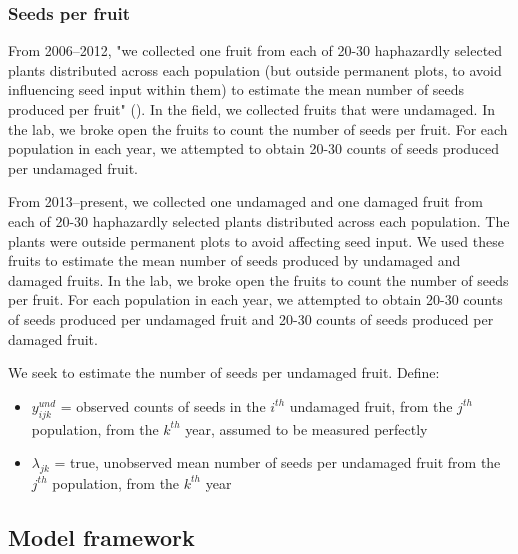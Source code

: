 \documentclass[12pt, oneside, titlepage]{article}   	%
\begin{document}
\subsubsection*{Seeds per fruit}

From 2006--2012, "we collected one fruit from each of 20-30 haphazardly selected plants distributed across each population (but outside permanent plots, to avoid influencing seed input within them) to estimate the mean number of seeds produced per fruit" (\cite{eckhart2011}). In the field, we collected fruits that were undamaged. In the lab, we broke open the fruits to count the number of seeds per fruit. For each population in each year, we attempted to obtain 20-30 counts of seeds produced per undamaged fruit. 

From 2013--present, we collected one undamaged and one damaged fruit from each of 20-30 haphazardly selected plants distributed across each population. The plants were outside permanent plots to avoid affecting seed input. We used these fruits to estimate the mean number of seeds produced by undamaged and damaged fruits. In the lab, we broke open the fruits to count the number of seeds per fruit. For each population in each year, we attempted to obtain 20-30 counts of seeds produced per undamaged fruit and  20-30 counts of seeds produced per damaged fruit. 

We seek to estimate the number of seeds per undamaged fruit. Define:


\begin{itemize}
	\item $y^{und}_{ijk}$ = observed counts of seeds in the $i^{th}$ undamaged fruit, from the $j^{th}$ population, from the $k^{th}$ year, assumed to be measured perfectly
	\item $\lambda_{jk}$ = true, unobserved mean number of seeds per undamaged fruit from the $j^{th}$ population, from the $k^{th}$ year
\end{itemize}

\subsection*{Model framework}
\end{document}
